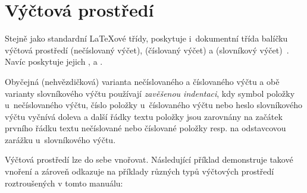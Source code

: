 
\chapter{Výčtová prostředí}\label{lisen}%

Stejně jako standardní \LaTeX ové třídy,
poskytuje i~dokumentní třída balíčku \pkg{\ipotname} výčtová prostředí
 (nečíslovaný výčet),  (číslovaný výčet) a
 (slovníkový výčet)~\cite{Ryb:2005:LaTeX:3,%
  Kop-Dal:2004:LaTeXPodrPruv:}. Navíc poskytuje jejich  ,  a .

Obyčejná (nehvězdičková) varianta nečíslovaného a číslovaného výčtu a obě
varianty slovníkového výčtu používají \emph{zavěšenou indentaci}, kdy symbol
položky u~nečíslovaného výčtu, číslo položky u~číslovaného výčtu nebo heslo
slovníkového výčtu vyčnívá doleva a další řádky textu položky jsou zarovnány
na začátek prvního řádku textu nečíslované nebo číslované položky resp. na
odstavcovou zarážku u~slovníkového výčtu.

Výčtová prostředí lze do sebe vnořovat. Následující příklad demonstruje takové
vnoření a zároveň odkazuje na příklady různých typů výčtových prostředí
roztroušených v tomto manuálu:

